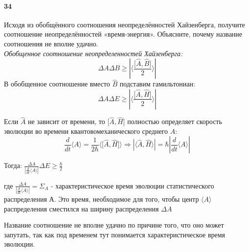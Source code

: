 


\paragraph{34}
Исходя из обобщённого соотношения неопределённостей Хайзенберга, получите соотношение неопределённостей «время-энергия». Объясните, почему название соотношения не вполне удачно.\\

\textit{Обобщенное соотношение неопределенностей Хайзенберга:}
$$\Delta A \Delta B \ge \left| \Big \langle \frac { \lbrack \widehat{A}, \widehat{B} \rbrack}{2} \Big \rangle \right| $$
В обобщенное соотношение вместо $\widehat{B}$ подставим гамильтониан:
 $$\Delta A \Delta E \ge \left| \Big \langle \frac { \lbrack \widehat{A}, \widehat{H} \rbrack}{2} \Big \rangle \right|$$

Если $\widehat{A}$ не зависит от времени, то $\lbrack \widehat{A}, \widehat{H} \rbrack$ полностью определяет скорость эволюции во времени
квантовомеханического среднего $A$:\\

$$\frac{d}{dt}\langle A \rangle = \frac{1}{2 \hbar} \langle \lbrack \widehat{A}, \widehat{H} \rbrack \rangle \Rightarrow \left| \langle \widehat{A}, \widehat{H}\rangle \right| = \hbar \left| \frac{d}{dt}\langle A \rangle \right|$$

Тогда: $\frac{\Delta A}{\left| \frac{d}{dt} \langle A \rangle \right| } \Delta E \ge \frac{\hbar}{2}$

где $\frac{\Delta A}{\left| \frac{d}{dt} \langle A \rangle \right| } = \Sigma_A $ - характеристическое время эволюции статистического распределения А. Это время, необходимое для того, чтобы центр $\langle A \rangle$ распределения сместился на ширину распределения $\Delta A$ 

Название соотношение не вполне удачно по причине того, что оно может запутать, так как под временем тут понимается характеристическое время эволюции. 

